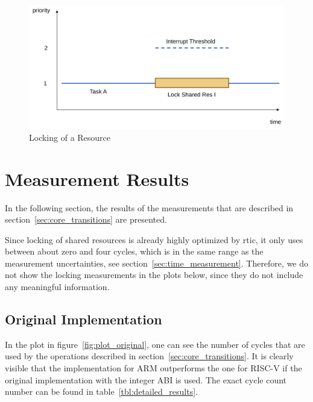 \begin{figure}
  \centerfloat
  \includegraphics[width=\textwidth]{fig/locking_low_prio.svg.pdf}
  \caption{Locking of a Resource}%
  \label{fig:locking_low_prio}
\end{figure}

\section{Measurement Results}

In the following section, the results of the measurements that are described in section~\ref{sec:core_transitions} are presented.

Since locking of shared resources is already highly optimized by \gls{rtic}, it only uses between about zero and four cycles, which is in the same range as the measurement uncertainties, see section~\ref{sec:time_measurement}. Therefore, we do not show the locking measurements in the plots below, since they do not include any meaningful information.

\subsection{Original Implementation}
\label{sec:results_original_implementation}

In the plot in figure~\ref{fig:plot_original}, one can see the number of cycles that are used by the operations described in section~\ref{sec:core_transitions}. It is clearly visible that the implementation for ARM outperforms the one for RISC-V if the original implementation with the integer ABI is used. The exact cycle count number can be found in table~\ref{tbl:detailed_results}.

